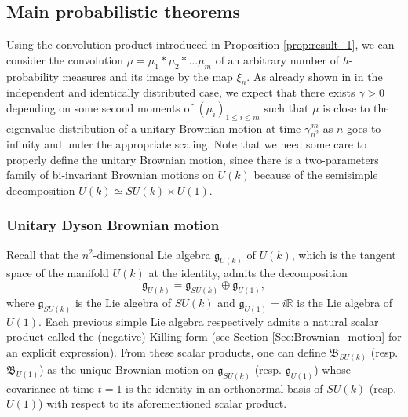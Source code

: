 \documentclass[10pt,11pt]{amsart}%
\begin{document}
\subsection{Main probabilistic theorems}\label{subsec:main_probabilistic_results}
Using the convolution product introduced in Proposition \ref{prop:result_1}, we can consider the convolution $\mu=\mu_1*\mu_2*\dots\mu_m$ of an arbitrary number of $h$-probability measures and its image by the map $\xi_n$. As already shown in \cite{De,We} in the independent and identically distributed case, we expect that there exists $\gamma>0$ depending on some second moments of $(\mu_i)_{1\leq i\leq m}$ such that $\mu$ is close to the eigenvalue distribution of a unitary Brownian motion at time $\gamma\frac{ m}{n^2}$ as $n$ goes to infinity and under the appropriate scaling. Note that we need some care to properly define the unitary Brownian motion, since there is a two-parameters family of bi-invariant Brownian motions on $U(k)$ because of the semisimple decomposition $U(k)\simeq SU(k)\times U(1)$. 

\subsubsection{Unitary Dyson Brownian motion}\label{subsubsec:Dyson_motion}

Recall that the $n^2$-dimensional Lie algebra $\mathfrak{g}_{U(k)}$ of $U(k)$, which is the tangent space of the manifold $U(k)$ at the identity, admits the decomposition 
$$\mathfrak{g}_{U(k)}=\mathfrak{g}_{SU(k)}\oplus \mathfrak{g}_{U(1)},$$
where $\mathfrak{g}_{SU(k)}$ is the Lie algebra of $SU(k)$ and $\mathfrak{g}_{U(1)}=i\mathbb{R}$ is the Lie algebra of $U(1)$. 
Each previous simple Lie algebra respectively admits a natural scalar product called the (negative) Killing form (see Section \ref{Sec:Brownian_motion} for an explicit expression). From these scalar products, one can define $\mathfrak{B}_{SU(k)}$ (resp. $\mathfrak{B}_{U(1)}$) as the unique Brownian motion on $\mathfrak{g}_{SU(k)}$ (resp. $\mathfrak{g}_{U(1)}$) whose covariance at time $t=1$ is the identity in an orthonormal basis of $SU(k)$ (resp. $U(1)$) with respect to its aforementioned scalar product.
\end{document}
